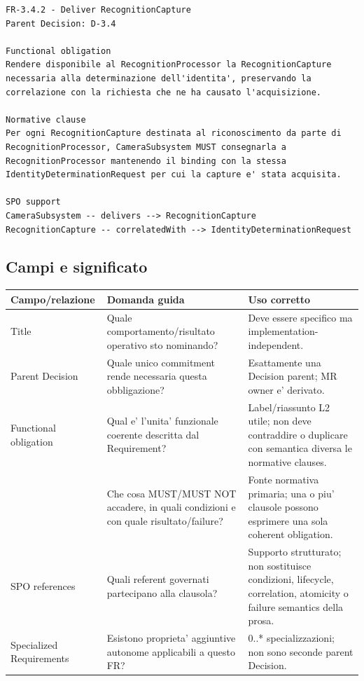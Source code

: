 \documentclass[11pt,a4paper]{article}
\begin{document}
\begin{ddtaexample}[title={Facial Access - FR-3.4.2 Deliver RecognitionCapture}]
\begin{lstlisting}
FR-3.4.2 - Deliver RecognitionCapture
Parent Decision: D-3.4

Functional obligation
Rendere disponibile al RecognitionProcessor la RecognitionCapture
necessaria alla determinazione dell'identita', preservando la
correlazione con la richiesta che ne ha causato l'acquisizione.

Normative clause
Per ogni RecognitionCapture destinata al riconoscimento da parte di
RecognitionProcessor, CameraSubsystem MUST consegnarla a
RecognitionProcessor mantenendo il binding con la stessa
IdentityDeterminationRequest per cui la capture e' stata acquisita.

SPO support
CameraSubsystem -- delivers --> RecognitionCapture
RecognitionCapture -- correlatedWith --> IdentityDeterminationRequest
\end{lstlisting}
\end{ddtaexample}

\subsection{Campi e significato}

\begin{longtable}{L{38mm}L{47mm}L{58mm}}
\toprule
\textbf{Campo/relazione} & \textbf{Domanda guida} & \textbf{Uso corretto} \\
\midrule\endhead
Title & Quale comportamento/risultato operativo sto nominando? & Deve essere specifico ma implementation-independent. \\
Parent Decision & Quale unico commitment rende necessaria questa obbligazione? & Esattamente una Decision parent; MR owner e' derivato. \\
Functional obligation & Qual e' l'unita' funzionale coerente descritta dal Requirement? & Label/riassunto L2 utile; non deve contraddire o duplicare con semantica diversa le normative clauses. \\
\NC{} & Che cosa MUST/MUST NOT accadere, in quali condizioni e con quale risultato/failure? & Fonte normativa primaria; una o piu' clausole possono esprimere una sola coherent obligation. \\
SPO references & Quali referent governati partecipano alla clausola? & Supporto strutturato; non sostituisce condizioni, lifecycle, correlation, atomicity o failure semantics della prosa. \\
Specialized Requirements & Esistono proprieta' aggiuntive autonome applicabili a questo FR? & 0..* specializzazioni; non sono seconde parent Decision. \\
\bottomrule
\end{longtable}
\end{document}
